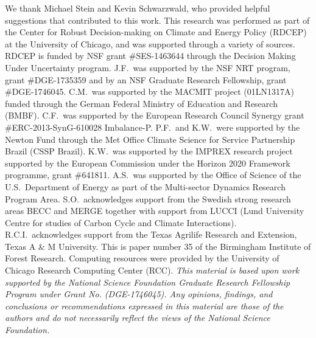 \documentclass[gmd, manuscript]{copernicus} %
\begin{document}



\begin{acknowledgements}
We thank Michael Stein and Kevin Schwarzwald, who provided helpful suggestions that contributed to this work. 
This research was performed as part of the Center for Robust Decision-making on Climate and Energy Policy (RDCEP) at the University of Chicago, and was supported through a variety of sources. 
RDCEP is funded by NSF grant \#SES-1463644 through the Decision Making Under Uncertainty program. 
J.F.\ was supported by the NSF NRT program, grant \#DGE-1735359 and by an NSF Graduate Research Fellowship, grant \#DGE-1746045. 
C.M.\ was supported by the MACMIT project (01LN1317A) funded through the German Federal Ministry of Education and Research (BMBF). 
C.F.\ was supported by the European Research Council Synergy grant \#ERC-2013-SynG-610028 Imbalance-P. 
P.F.\ and K.W.\ were supported  by the Newton Fund through the Met Office Climate Science for Service Partnership Brazil (CSSP Brazil). 
K.W.\ was supported by the IMPREX research project supported by the European Commission under the Horizon 2020 Framework programme, grant \#641811. 
A.S.\ was supported by the Office of Science of the U.S.\ Department of Energy as part of the Multi-sector Dynamics Research Program Area. 
S.O.\ acknowledges support from the Swedish strong research areas BECC and MERGE together with support from LUCCI (Lund University Centre for studies of Carbon Cycle and Climate Interactions). 
R.C.I.\ acknowledges support from the Texas Agrilife Research and Extension, Texas A \& M University. 
This is paper number 35 of the Birmingham Institute of Forest Research. 
Computing resources were provided by the University of Chicago Research Computing Center (RCC).
\smallskip
\textit{This material is based upon work supported by the National Science Foundation Graduate Research Fellowship Program under Grant No. (DGE-1746045). 
Any opinions, findings, and conclusions or recommendations expressed in this material are those of the authors and do not necessarily reflect the views of the National Science Foundation.}
\end{acknowledgements}



\end{document}
